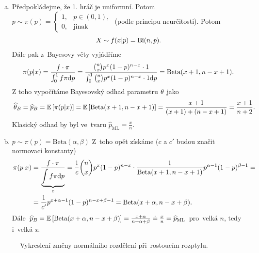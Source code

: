 \begin{example}
	\begin{enumerate}[a)]
		\item Předpokládejme, že 1. hráč je uniformní. Potom $p\sim\pi(p)=\begin{cases}
		1,& p\in (0,1),\\ 0,&\text{jinak}
		\end{cases}$ (podle principu neurčitosti). Potom
		$$ X\sim f(x|p)=\mathrm{Bi}(n,p).$$
		Dále pak z~Bayesovy věty vyjádříme
		$$ \pi(p|x)=\frac{f\cdot\pi}{\int_0^1 f\pi\mathrm{d} p}=\frac{\binom{n}{x}p^x(1-p)^{n-x}\cdot 1}{\int_0^1 \binom{n}{x}p^x(1-p)^{n-x}\cdot1 \mathrm{d} p}=\mathrm{Beta}(x+1,n-x+1).$$
		Z toho vypočítáme Bayesovský odhad parametru $\theta$ jako
		$$ \widehat{\theta}_B=\widehat{p}_B=\mathbb{E}\left[ \pi(p|x) \right]=\mathbb{E}\left[ \mathrm{Beta}(x+1,n-x+1) \right]=\frac{x+1}{(x+1)+(n-x+1)}=\frac{x+1}{n+2}.$$
		Klasický odhad by byl ve~tvaru $\widehat{p}_{\mathrm{ML}}=\frac{x}{n}$.
		\item $p\sim \pi(p)=\mathrm{Beta}(\alpha,\beta)$ Z~toho opět získáme ($c$ a $c'$ budou značit normovací konstanty)
		\[
		\begin{split}
		\pi(p|x)&=\frac{f\cdot\pi}{\underbrace{\int f\pi\mathrm{d} p}_c}=\frac{1}{c}\binom{n}{x}p^x(1-p)^{n-x}\cdot \frac{1}{\mathrm{Beta}(x+1,n-x+1)}p^{\alpha-1}(1-p)^{\beta-1}=\\&=\frac{1}{c'}p^{x+\alpha-1}(1-p)^{n-x+\beta-1}=\mathrm{Beta}(x+\alpha,n-x+\beta).
		\end{split}
		\] 
		Dále
		$\widehat{p}_B=\mathbb{E}\left[ \mathrm{Beta}(x+\alpha,n-x+\beta) \right]=\frac{x+\alpha}{n+\alpha+\beta}\doteq\frac{x}{n} = \widehat{p}_\mathrm{ML}$ pro~velká $n$, tedy i~velká \textit{x}.
	\end{enumerate}
\end{example}

\begin{figure}[h]
	\centering
	\caption{Vykreslení změny normálního rozdělení při~rostoucím rozptylu.}
\end{figure}

